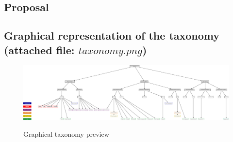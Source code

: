\documentclass[11pt]{article}
\begin{document}
% 

% 

\newpage

\section{Proposal}


% 



% 

% 

\newpage

\begin{appendices}

\chapter{Graphical representation of the taxonomy (attached file: $taxonomy.png$)}

\begin{figure}[H]
	\caption{Graphical taxonomy preview}
	\centering
	\includegraphics[keepaspectratio,width=0.6\paperwidth]{figures/taxonomy.png}
	\label{fig:taxonomy}
\end{figure}

\end{appendices}

\newpage



\end{document}
